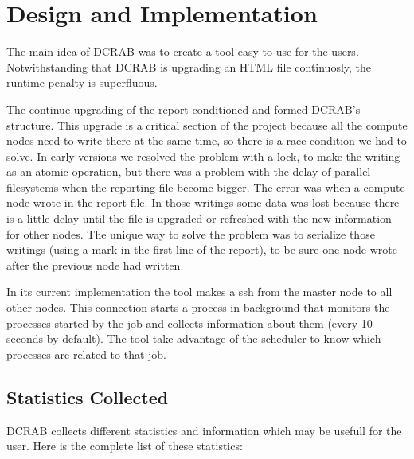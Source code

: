 \documentclass[10pt,a4paper]{report}
\begin{document}
\chapter{Design and Implementation}
\label{designAndImplementation}
The main idea of DCRAB was to create a tool easy to use for the users. Notwithstanding that DCRAB is upgrading an HTML file continuosly, the runtime penalty is superfluous.

The continue upgrading of the report conditioned and formed DCRAB's structure. This upgrade is a critical section of the project because all the compute nodes need to write there at the same time, so there is a race condition we had to solve. In early versions we resolved the problem with a lock, to make the writing as an atomic operation, but there was a problem with the delay of parallel filesystems when the reporting file become bigger. The error was when a compute node wrote in the report file. In those writings some data was lost because there is a little delay until the file is upgraded or refreshed with the new information for other nodes. The unique way to solve the problem was to serialize those writings (using a mark in the first line of the report), to be sure one node wrote after the previous node had written.

In its current implementation the tool makes a ssh from the master node to all other nodes. This connection starts a process in background that monitors the processes started by the job and collects information about them (every 10 seconds by default). The tool take advantage of the scheduler to know which processes are related to that job.

\section{Statistics Collected}

DCRAB collects different statistics and information which may be usefull for the user. Here is the complete list of these statistics:
\end{document}
